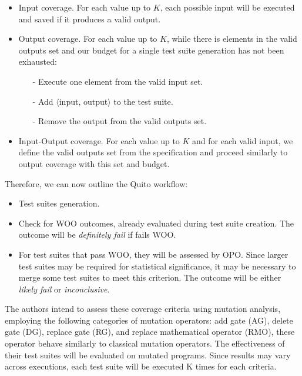 \begin{itemize}
\vspace{-3pt}
\begin{itemize}
    \item Input coverage. For each value up to $K$, each possible input will be executed and saved if it produces a valid output.
    \item Output coverage. For each value up to $K$, while there is elements in the valid outputs set and our budget for a single test suite generation has not been exhausted:
    \begin{itemize}
        \item[-] Execute one element from the valid input set.
        \item[-] Add $\langle$input, output$\rangle$ to the test suite.
        \item[-] Remove the output from the valid outputs set.
    \end{itemize}
    \item Input-Output coverage. For each value up to $K$ and for each valid input, we define the valid outputs set from the specification and proceed similarly to output coverage with this set and budget.
\end{itemize}

Therefore, we can now outline the Quito workflow:
\begin{itemize}
    \item Test suites generation.
    \item Check for WOO outcomes, already evaluated during test suite creation. The outcome will be \textit{definitely fail} if fails WOO.
    \item For test suites that pass WOO, they will be assessed by OPO. Since larger test suites may be required for statistical significance, it may be necessary to merge some test suites to meet this criterion. The outcome will be either \textit{likely fail} or \textit{inconclusive}.
\end{itemize}

The authors intend to assess these coverage criteria using mutation analysis, employing the following categories of mutation operators: add gate (AG), delete gate (DG), replace gate (RG), and replace mathematical operator (RMO), these operator behave similarly to classical mutation operators. The effectiveness of their test suites will be evaluated on mutated programs. Since results may vary across executions, each test suite will be executed K times for each criteria.\newline


\end{itemize}
